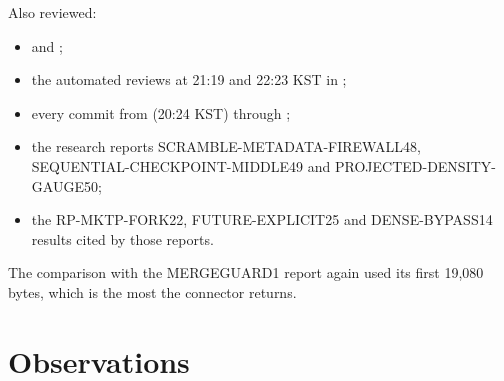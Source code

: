 \documentclass[11pt]{article}
\begin{document}
Also reviewed:
\begin{itemize}
\item {} and ;
\item the automated reviews at 21:19 and 22:23 KST in
;
\item every commit from  (20:24 KST) through
;
\item the research reports SCRAMBLE-METADATA-FIREWALL48,
SEQUENTIAL-CHECKPOINT-MIDDLE49 and PROJECTED-DENSITY-GAUGE50;
\item the RP-MKTP-FORK22, FUTURE-EXPLICIT25 and DENSE-BYPASS14 results
cited by those reports.
\end{itemize}
The comparison with the MERGEGUARD1 report again used its first 19{,}080
bytes, which is the most the connector returns.

\section{Observations}
\end{document}
